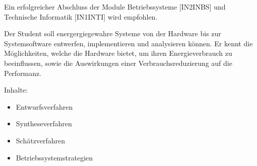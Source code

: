 \begin{module}
\begin{styleenv}
\begin{conditions}
\end{conditions}

\begin{recommendations}Ein erfolgreicher Abschluss der Module Betriebssysteme [IN2INBS] und Technische Informatik [IN1INTI] wird empfohlen.

\end{recommendations}
\end{styleenv}

\begin{learningoutcomes}
Der Student soll energergiegewahre Systeme von der Hardware bis zur Systemsoftware entwerfen, implementieren und analysieren können. Er kennt die Möglichkeiten, welche die Hardware bietet, um ihren Energieverbrauch zu beeinflussen, sowie die Auswirkungen einer Verbrauchsreduzierung auf die Performanz.


\end{learningoutcomes}

\begin{content}
Inhalte:

 \begin{itemize}\item Entwurfsverfahren  \item Syntheseverfahren  \item Schätzverfahren  \item  Betriebssystemstrategien   \end{itemize}
\end{content}



\end{module}

